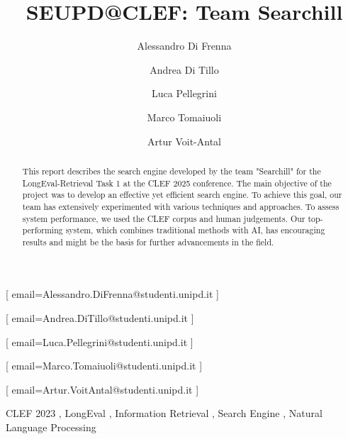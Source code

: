 \documentclass{ceurart}
\begin{document}


\title{SEUPD@CLEF: Team Searchill}

\author[1]{Alessandro Di Frenna}[%
email=Alessandro.DiFrenna@studenti.unipd.it
]

\author[1]{Andrea Di Tillo}[%
email=Andrea.DiTillo@studenti.unipd.it
]

\author[1]{Luca Pellegrini}[%
email=Luca.Pellegrini@studenti.unipd.it
]

\author[1]{Marco Tomaiuoli}[%
email=Marco.Tomaiuoli@studenti.unipd.it
]

\author[1]{Artur Voit-Antal}[%
email=Artur.VoitAntal@studenti.unipd.it
]

\address[1]{University of Padua, Italy}


\begin{abstract}
  This report describes the search engine developed by the team "Searchill" for the LongEval-Retrieval Task 1 at the CLEF 2025 conference. The main objective of the project was to develop an effective yet efficient search engine. To achieve this goal, our team has extensively experimented with various techniques and approaches. To assess system performance, we used the CLEF corpus and human judgements. 
  Our top-performing system, which combines traditional methods with AI, has encouraging results and might be the basis for further advancements in the field.
\end{abstract}

\begin{keywords}
  CLEF 2023 \sep
  LongEval \sep
  Information Retrieval \sep
  Search Engine \sep
  Natural Language Processing  
\end{keywords}
\end{document}
